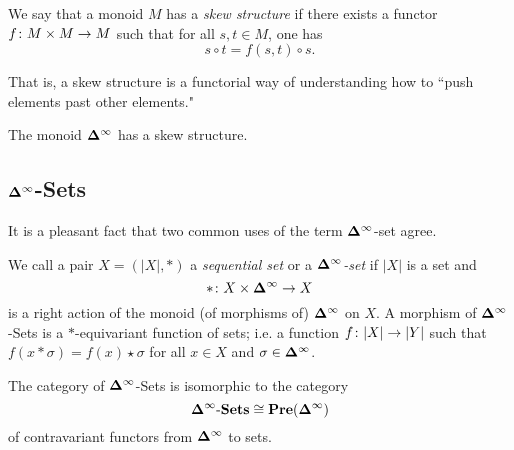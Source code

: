 \documentclass{amsart}
\def\Del{{\bf \Delta}}
\def\dashSets{{\tn{-}\Sets}}
\def\Delinf{{\Del^\infty}}
\def\DSets{{\Delinf\dashSets}}
\begin{document}
\begin{definition}

We say that a monoid $M$ has a {\em skew structure} if there exists a functor $f\colon M\times M\rightarrow M$ such that for all $s,t\in M$, one has $$s\circ t=f(s,t)\circ s.$$

\end{definition}

That is, a skew structure is a functorial way of understanding how to ``push elements past other elements."

\begin{lemma}

The monoid $\Delinf$ has a skew structure.

\end{lemma}

\subsection{$\Delinf$-Sets}

It is a pleasant fact that two common uses of the term $\Delinf$-set agree.

\begin{definition}

We call a pair $X=(|X|,*)$ a {\em sequential set} or a {\em $\Delinf$-set} if $|X|$ is a set and $$*\taking X\cross\Delinf\to X$$ is a right action of the monoid (of morphisms of) $\Delinf$ on $X$.  A morphism of $\Delinf$-Sets is a $*$-equivariant function of sets; i.e. a function $f\colon|X|\rightarrow|Y|$ such that $f(x*\sigma)=f(x)\star\sigma$ for all $x\in X$ and $\sigma\in\Delinf$.

The category of $\Delinf$-Sets is isomorphic to the category $$\DSets\iso\Pre(\Delinf)$$ of contravariant functors from $\Delinf$ to sets.  

\end{definition}
\end{document}
